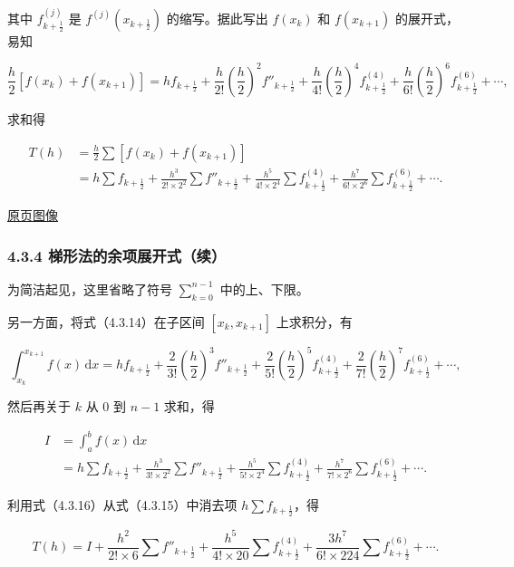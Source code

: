 \documentclass[
  10pt,
  fontset=fandol]{ctexart}
\begin{document}
其中 \(f^{(j)}_{k+\frac12}\) 是 \(f^{(j)}(x_{k+\frac12})\) 的缩写。据此写出 \(f(x_k)\) 和 \(f(x_{k+1})\) 的展开式，易知

\[
\frac h2[f(x_k)+f(x_{k+1})]
=hf_{k+\frac12}+\frac h{2!}\left(\frac h2\right)^2f''_{k+\frac12}
+\frac h{4!}\left(\frac h2\right)^4f^{(4)}_{k+\frac12}
+\frac h{6!}\left(\frac h2\right)^6f^{(6)}_{k+\frac12}+\cdots,
\]

求和得

\[
\begin{aligned}
T(h)&=\frac h2\sum[f(x_k)+f(x_{k+1})]\\
&=h\sum f_{k+\frac12}+\frac{h^3}{2!\times2^2}\sum f''_{k+\frac12}
+\frac{h^5}{4!\times2^4}\sum f^{(4)}_{k+\frac12}
+\frac{h^7}{6!\times2^6}\sum f^{(6)}_{k+\frac12}+\cdots.
\end{aligned}
\tag{4.3.15}
\]

\href{../../source-images/pdf-106.jpeg}{原页图像}

\subsubsection{4.3.4 梯形法的余项展开式（续）}\label{ux68afux5f62ux6cd5ux7684ux4f59ux9879ux5c55ux5f00ux5f0fux7eed}

为简洁起见，这里省略了符号 \(\displaystyle\sum_{k=0}^{n-1}\) 中的上、下限。

另一方面，将式（4.3.14）在子区间 \([x_k,x_{k+1}]\) 上求积分，有

\[
\int_{x_k}^{x_{k+1}}f(x)\,\mathrm{d}x
=hf_{k+\frac12}
+\frac{2}{3!}\left(\frac h2\right)^3f''_{k+\frac12}
+\frac{2}{5!}\left(\frac h2\right)^5f^{(4)}_{k+\frac12}
+\frac{2}{7!}\left(\frac h2\right)^7f^{(6)}_{k+\frac12}+\cdots,
\]

然后再关于 \(k\) 从 \(0\) 到 \(n-1\) 求和，得

\[
\begin{aligned}
I&=\int_a^b f(x)\,\mathrm{d}x\\
&=h\sum f_{k+\frac12}
+\frac{h^3}{3!\times2^2}\sum f''_{k+\frac12}
+\frac{h^5}{5!\times2^4}\sum f^{(4)}_{k+\frac12}
+\frac{h^7}{7!\times2^6}\sum f^{(6)}_{k+\frac12}+\cdots.
\end{aligned}
\tag{4.3.16}
\]

利用式（4.3.16）从式（4.3.15）中消去项 \(h\sum f_{k+\frac12}\)，得

\[
T(h)=I+\frac{h^2}{2!\times6}\sum f''_{k+\frac12}
+\frac{h^5}{4!\times20}\sum f^{(4)}_{k+\frac12}
+\frac{3h^7}{6!\times224}\sum f^{(6)}_{k+\frac12}+\cdots.
\tag{4.3.17}
\]
\end{document}
